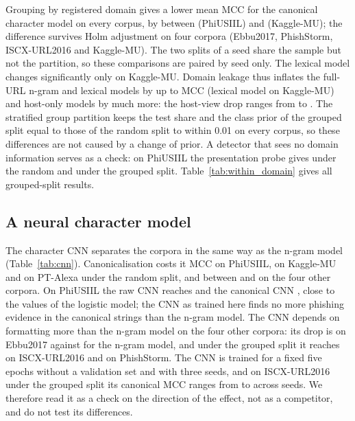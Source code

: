 Grouping by registered domain gives a lower mean MCC for the canonical character model on every corpus, by between \DCanonRandomVsDomainPhiUSIIL{} (PhiUSIIL) and \DCanonRandomVsDomainKaggleMU{} (Kaggle-MU); the difference survives Holm adjustment on four corpora (Ebbu2017, PhishStorm, ISCX-URL2016 and Kaggle-MU). The two splits of a seed share the sample but not the partition, so these comparisons are paired by seed only. The lexical model changes significantly only on Kaggle-MU. Domain leakage thus inflates the full-URL n-gram and lexical models by up to \DLexicalRandomVsDomainKaggleMU{} MCC (lexical model on Kaggle-MU) and host-only models by much more: the host-view drop ranges from \DHostRandomVsDomainPhiUSIIL{} to \DHostRandomVsDomainISCXURL. The stratified group partition keeps the test share and the class prior of the grouped split equal to those of the random split to within 0.01 on every corpus, so these differences are not caused by a change of prior. A detector that sees no domain information serves as a check: on PhiUSIIL the presentation probe gives \WPhiUSIILRandomPresentation{} under the random and \WPhiUSIILDomainPresentation{} under the grouped split. Table~\ref{tab:within_domain} gives all grouped-split results.



\subsection{A neural character model}
\label{sec:cnn}
The character CNN separates the corpora in the same way as the n-gram model (Table~\ref{tab:cnn}). Canonicalisation costs it \CNNDropPhiUSIILRandom{} MCC on PhiUSIIL, \CNNDropKaggleMURandom{} on Kaggle-MU and \CNNDropPTAlexaRandom{} on PT-Alexa under the random split, and between \CNNDropISCXURLRandom{} and \CNNDropHannousseRandom{} on the four other corpora. On PhiUSIIL the raw CNN reaches \CNNPhiUSIILRandomRaw{} and the canonical CNN \CNNPhiUSIILRandomCanon{}, close to the values of the logistic model; the CNN as trained here finds no more phishing evidence in the canonical strings than the n-gram model. The CNN depends on formatting more than the n-gram model on the four other corpora: its drop is \CNNDropEbbuRandom{} on Ebbu2017 against \DRawVsCanonEbbu{} for the n-gram model, and under the grouped split it reaches \CNNDropISCXURLDomain{} on ISCX-URL2016 and \CNNDropPhishStormDomain{} on PhishStorm. The CNN is trained for a fixed five epochs without a validation set and with three seeds, and on ISCX-URL2016 under the grouped split its canonical MCC ranges from \CNNMinISCXURLDomainCanon{} to \CNNMaxISCXURLDomainCanon{} across seeds. We therefore read it as a check on the direction of the effect, not as a competitor, and do not test its differences.

